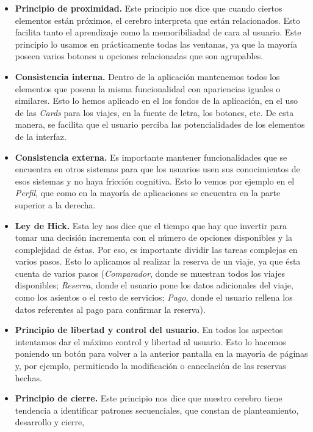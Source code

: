 \begin{itemize}

      \item \textbf{Principio de proximidad.} Este principio nos dice que cuando ciertos elementos están próximos, el cerebro interpreta
            que están relacionados. Esto facilita tanto el aprendizaje como la memoribiliadad de cara al usuario. Este principio lo usamos en prácticamente
            todas las ventanas, ya que la mayoría poseen varios botones u opciones relacionadas que son agrupables.
      \item \textbf{Consistencia interna.} Dentro de la aplicación mantenemos todos los elementos que posean la misma funcionalidad con apariencias iguales
            o similares. Esto lo hemos aplicado en el los fondos de la aplicación, en el uso de las \textit{Cards} para los viajes, en la fuente de letra, los
            botones, etc. De esta manera, se facilita que el usuario perciba las potencialidades de los elementos de la interfaz.
      \item \textbf{Consistencia externa.} Es importante mantener funcionalidades que se encuentra en otros sistemas para que los usuarios usen sus conocimientos
            de esos sistemas y no haya fricción cognitiva. Esto lo vemos por ejemplo en el \textit{Perfil}, que como en la mayoría de aplicaciones se encuentra en la parte
            superior a la derecha.
      \item \textbf{Ley de Hick.} Esta ley nos dice que el tiempo que hay que invertir para tomar una decisión incrementa con el número de opciones disponibles y la complejidad
            de éstas. Por eso, es importante dividir las tareas complejas en varios pasos. Esto lo aplicamos al realizar la reserva de un viaje, ya que ésta cuenta de varios
            pasos (\textit{Comparador}, donde se muestran todos los viajes disponibles; \textit{Reserva}, donde el usuario pone los datos adicionales del viaje, como los asientos
            o el resto de servicios; \textit{Pago}, donde el usuario rellena los datos referentes al pago para confirmar la reserva).
      \item \textbf{Principio de libertad y control del usuario.} En todos los aspectos intentamos dar el máximo control y libertad al usuario. Esto lo hacemos poniendo un botón para volver a la anterior
            pantalla en la mayoría de páginas y, por ejemplo, permitiendo la modificación o cancelación de las reservas hechas.
      \item \textbf{Principio de cierre.} Este principio nos dice que nuestro cerebro tiene tendencia a identificar patrones secuenciales, que constan de planteamiento, desarrollo y cierre,

\end{itemize}

